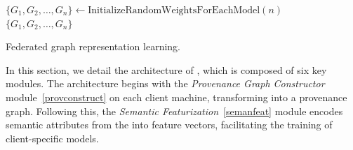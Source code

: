 \begin{algorithm}[!t]
  \scriptsize
  \DontPrintSemicolon
  \BlankLine
  $\{G_1, G_2, \ldots, G_n\} \leftarrow \text{InitializeRandomWeightsForEachModel}(n)$\\
  \BlankLine
  \BlankLine
  \BlankLine
  \Return $\{G_1, G_2, \ldots, G_n\}$\\
  \BlankLine
  \caption{Federated graph representation learning.}
  \label{alg:federated_learning}
\end{algorithm}

In this section, we detail the architecture of \Sys, which is composed of six key modules. The architecture begins with the \textit{Provenance Graph Constructor} module~\ref{provconstruct} on each client machine, transforming \logs into a provenance graph. Following this, the \textit{Semantic Featurization}~\ref{semanfeat} module encodes semantic attributes from the \logs into feature vectors, facilitating the training of client-specific \gnnshort models.

